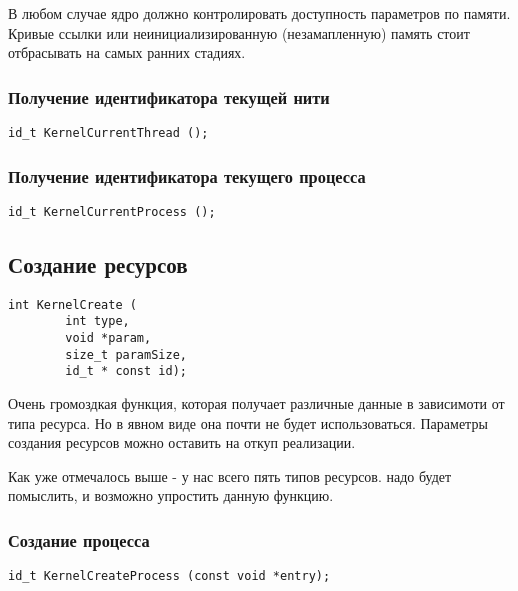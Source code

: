 В любом случае ядро должно контролировать доступность параметров по памяти.
Кривые ссылки или неинициализированную (незамапленную) память стоит отбрасывать
на самых ранних стадиях.


\subsubsection{Получение идентификатора текущей нити}

\begin{verbatim}
id_t KernelCurrentThread ();
\end{verbatim}\par

\subsubsection{Получение идентификатора текущего процесса}


\begin{verbatim}
id_t KernelCurrentProcess ();
\end{verbatim}\par

\subsection{Создание ресурсов}

\begin{verbatim}
int KernelCreate (
        int type,
        void *param,
        size_t paramSize,
        id_t * const id);
\end{verbatim}\par

Очень громоздкая функция, которая получает различные данные в зависимоти от типа
ресурса. Но в явном виде она почти не будет использоваться. Параметры создания
ресурсов можно оставить на откуп реализации.

Как уже отмечалось выше - у нас всего пять типов ресурсов. надо будет помыслить,
и возможно упростить данную функцию.

\subsubsection{Создание процесса}

\begin{verbatim}
id_t KernelCreateProcess (const void *entry);
\end{verbatim}\par

